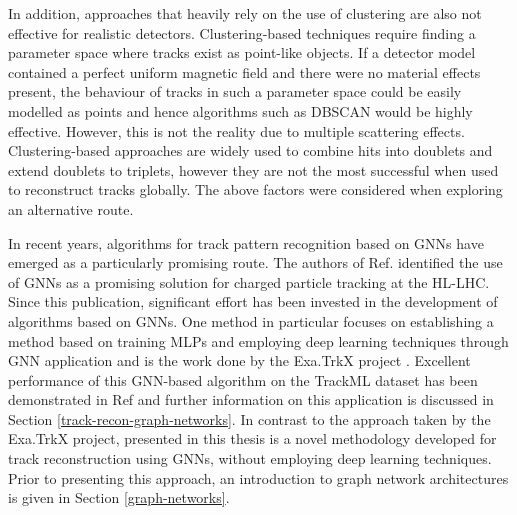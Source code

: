 In addition, approaches that heavily rely on the use of clustering are also not effective for realistic detectors. Clustering-based techniques require finding a parameter space where tracks exist as point-like objects. If a detector model contained a perfect uniform magnetic field and there were no material effects present, the behaviour of tracks in such a parameter space could be easily modelled as points and hence algorithms such as DBSCAN would be highly effective. However, this is not the reality due to multiple scattering effects. Clustering-based approaches are widely used to combine hits into doublets and extend doublets to triplets, however they are not the most successful when used to reconstruct tracks globally. The above factors were considered when exploring an alternative route. 

In recent years, algorithms for track pattern recognition based on GNNs have emerged as a particularly promising route. The authors of Ref. \cite{farrell2018novel} identified the use of GNNs as a promising solution for charged particle tracking at the HL-LHC. Since this publication, significant effort has been invested in the development of algorithms based on GNNs. One method in particular focuses on establishing a method based on training MLPs and employing deep learning techniques through GNN application and is the work done by the Exa.TrkX project \cite{ExaTrkX-website, Caillou:28155782}. Excellent performance of this GNN-based algorithm on the TrackML dataset \cite{refId0} has been demonstrated in Ref \cite{Ju_2021} and further information on this application is discussed in Section \ref{track-recon-graph-networks}. In contrast to the approach taken by the Exa.TrkX project, presented in this thesis is a novel methodology developed for track reconstruction using GNNs, without employing deep learning techniques. Prior to presenting this approach, an introduction to graph network architectures is given in Section \ref{graph-networks}.





